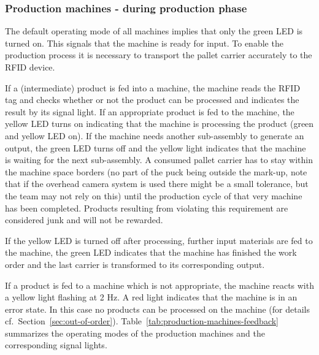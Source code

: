 \documentclass[12pt,twoside]{article}
\newcommand{\refsec}[1]{Section~\ref{#1}}
\begin{document}
\subsubsection{Production machines - during production phase}
The default operating mode of all machines implies that only the green
LED is turned on. This signals that the machine is ready for input.
To enable the production process it is necessary to transport the
pallet carrier accurately to the RFID device.

If a (intermediate) product is fed into a machine, the machine reads
the RFID tag and checks whether or not the product can be processed
and indicates the result by its signal light. If an appropriate
product is fed to the machine, the yellow LED turns on indicating that
the machine is processing the product (green and yellow LED on). If
the machine needs another sub-assembly to generate an output, the
green LED turns off and the yellow light indicates that the machine is
waiting for the next sub-assembly. A consumed pallet carrier has to
stay within the machine space borders (no part of the puck being
outside the mark-up, note that if the overhead camera system is used
there might be a small tolerance, but the team may not rely on this)
until the production cycle of that very machine has been completed.
Products resulting from violating this requirement are considered junk
and will not be rewarded.

If the yellow LED is turned off after processing, further input
materials are fed to the machine, the green LED indicates that the
machine has finished the work order and the last carrier is
transformed to its corresponding output.

If a product is fed to a machine which is not appropriate, the machine
reacts with a yellow light flashing at 2 Hz. A red light indicates
that the machine is in an error state.  In this case no products can
be processed on the machine (for details
cf.~\refsec{sec:out-of-order}).
Table~\ref{tab:production-machines-feedback} summarizes the operating
modes of the production machines and the corresponding signal lights.
\end{document}
